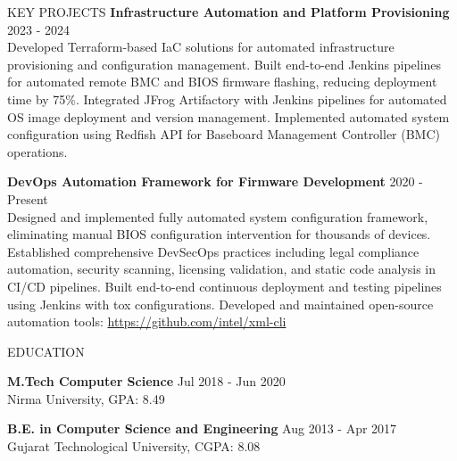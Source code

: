 \documentclass{resume} %
\begin{document}
\begin{rSection}{KEY PROJECTS}
\textbf{Infrastructure Automation and Platform Provisioning} \hfill {2023 - 2024}\\
Developed Terraform-based IaC solutions for automated infrastructure provisioning and configuration management. Built end-to-end Jenkins pipelines for automated remote BMC and BIOS firmware flashing, reducing deployment time by 75\%. Integrated JFrog Artifactory with Jenkins pipelines for automated OS image deployment and version management. Implemented automated system configuration using Redfish API for Baseboard Management Controller (BMC) operations.

\textbf{DevOps Automation Framework for Firmware Development}  \hfill {2020 - Present} \\
Designed and implemented fully automated system configuration framework, eliminating manual BIOS configuration intervention for thousands of devices. Established comprehensive DevSecOps practices including legal compliance automation, security scanning, licensing validation, and static code analysis in CI/CD pipelines. Built end-to-end continuous deployment and testing pipelines using Jenkins with tox configurations. Developed and maintained open-source automation tools: \href{https://github.com/intel/xml-cli}{https://github.com/intel/xml-cli}


\end{rSection}




\begin{rSection}{EDUCATION}

{\bf M.Tech Computer Science} \hfill {Jul 2018 - Jun 2020 }\\
Nirma University, GPA: 8.49

{\bf B.E. in Computer Science and Engineering} \hfill {Aug 2013 - Apr 2017 }\\
Gujarat Technological University, CGPA: 8.08

\end{rSection}
\end{document}
